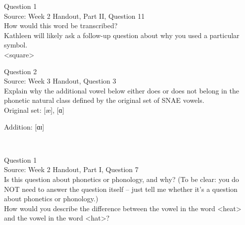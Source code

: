 \documentclass[12pt]{article}
\begin{document}
{\large Question 1}\\

Source: Week 2 Handout, Part II, Question 11\\

How would this word be transcribed?\\ Kathleen will likely ask a follow-up question about why you used a particular symbol.\\

<square>


\newpage

{\large Question 2}\\

Source: Week 3 Handout, Question 3\\

Explain why the additional vowel below either does or does not belong in the phonetic natural class defined by the original set of SNAE vowels.\\

Original set: {[æ]}, {[ɑ]}

Addition: {[ɑɪ]}


\newpage

\begin{center}
\textbf{{\color{red}{\HUGE END OF EXAM}}}\\

\end{center}
\newpage

\begin{center}
\textbf{{\color{blue}{\HUGE START OF EXAM\\}}}

\textbf{{\color{blue}{\HUGE Student ID: 60523\\}}}

\textbf{{\color{blue}{\HUGE 4:20\\}}}

\end{center}
\newpage

{\large Question 1}\\

Source: Week 2 Handout, Part I, Question 7\\

Is this question about phonetics or phonology, and why? (To be clear: you do NOT need to answer the question itself -- just tell me whether it's a question about phonetics or phonology.)\\

How would you describe the difference between the vowel in the word <heat> and the vowel in the word <hat>?
\end{document}
